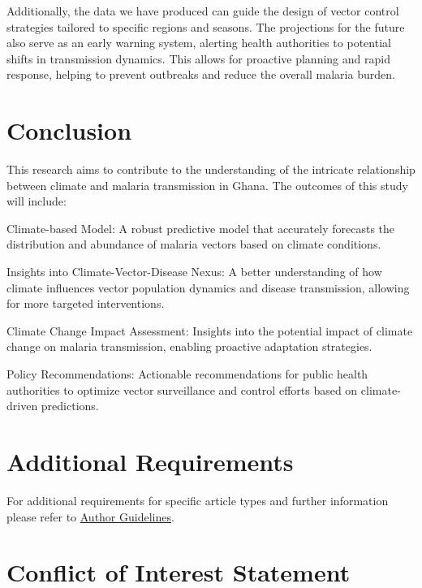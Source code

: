\documentclass[utf8]{FrontiersinHarvard} %
\begin{document}
 Additionally, the data we have produced can guide the design of vector control strategies tailored to specific regions and seasons. The projections for the future also serve as an early warning system, alerting health authorities to potential shifts in transmission dynamics. This allows for proactive planning and rapid response, helping to prevent outbreaks and reduce the overall malaria burden.





\section{Conclusion}
This research aims to contribute to the understanding of the intricate relationship between climate and malaria transmission in Ghana. The outcomes of this study will include:

    Climate-based Model: A robust predictive model that accurately forecasts the distribution and abundance of malaria vectors based on climate conditions.

    Insights into Climate-Vector-Disease Nexus: A better understanding of how climate influences vector population dynamics and disease transmission, allowing for more targeted interventions.

    Climate Change Impact Assessment: Insights into the potential impact of climate change on malaria transmission, enabling proactive adaptation strategies.

    Policy Recommendations: Actionable recommendations for public health authorities to optimize vector surveillance and control efforts based on climate-driven predictions.







\section{Additional Requirements}

For additional requirements for specific article types and further information please refer to \href{http://www.frontiersin.org/about/AuthorGuidelines#AdditionalRequirements}{Author Guidelines}.

\section*{Conflict of Interest Statement}
\end{document}

